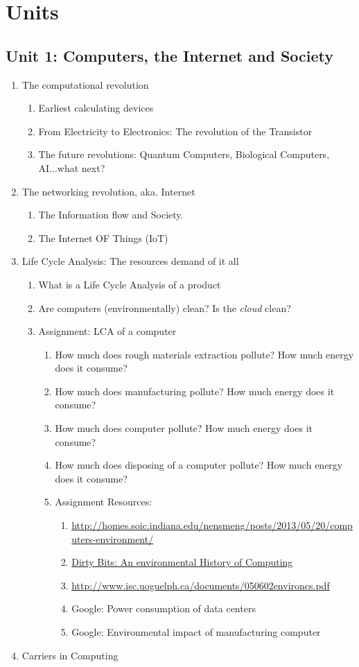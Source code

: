 \documentclass{report}
\begin{document}
\chapter{Units}
\section{Unit 1: Computers, the Internet and Society }
\begin{enumerate}
\item The computational revolution
	\begin{enumerate}
	\item Earliest calculating devices
	\item From Electricity to Electronics: The revolution of the Transistor
	\item The future revolutions: Quantum Computers, Biological Computers, AI...what next?
	\end{enumerate}
\item The networking revolution, aka. Internet
	\begin{enumerate}
	\item The Information flow and Society.
	\item The Internet OF Things (IoT)
	\end{enumerate}
\item Life Cycle Analysis: The resources demand of it all
	\begin{enumerate}
	\item What is a Life Cycle Analysis of a product
	\item Are computers (environmentally) clean? Is the {\sl cloud} clean?
	\item Assignment: LCA of a computer
	\begin{enumerate}
	\item How much does rough materials extraction pollute? How much energy does it consume?
	\item How much does manufacturing pollute?  How much energy does it consume?
	\item How much does computer pollute?  How much energy does it consume?
	\item How much does disposing of a computer pollute? How much energy does it consume?
	\item Assignment Resources:
		\begin{enumerate}
		\item \url{http://homes.soic.indiana.edu/nensmeng/posts/2013/05/20/computers-environment/}
		\item \href{http://homes.soic.indiana.edu/nensmeng/enviro-compute/}{Dirty Bits: An environmental History of Computing}
		\item \url{http://www.isc.uoguelph.ca/documents/050602environcs.pdf}
		\item Google: Power consumption of data centers
		\item Google: Environmental impact of manufacturing computer
		\end{enumerate}
	\end{enumerate}
	\end{enumerate}
\item Carriers in Computing
\end{enumerate}
\end{document}
